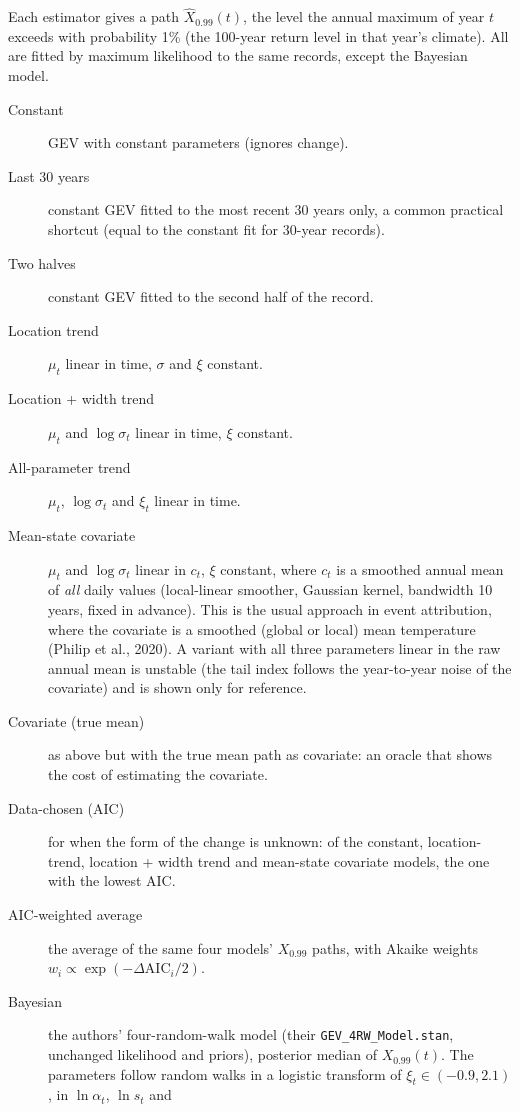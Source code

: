 \documentclass[11pt]{article}
\begin{document}
Each estimator gives a path $\hat X_{0.99}(t)$, the level the annual maximum of year $t$ exceeds
with probability 1\% (the 100-year return level in that year's climate). All are fitted by
maximum likelihood to the same records, except the Bayesian model.
\begin{description}
\item[Constant] GEV with constant parameters (ignores change).
\item[Last 30 years] constant GEV fitted to the most recent 30 years only, a common practical
  shortcut (equal to the constant fit for 30-year records).
\item[Two halves] constant GEV fitted to the second half of the record.
\item[Location trend] $\mu_t$ linear in time, $\sigma$ and $\xi$ constant.
\item[Location + width trend] $\mu_t$ and $\log\sigma_t$ linear in time, $\xi$ constant.
\item[All-parameter trend] $\mu_t$, $\log\sigma_t$ and $\xi_t$ linear in time.
\item[Mean-state covariate] $\mu_t$ and $\log\sigma_t$ linear in $c_t$, $\xi$ constant, where
  $c_t$ is a smoothed annual mean of \emph{all} daily values (local-linear smoother, Gaussian
  kernel, bandwidth 10 years, fixed in advance). This is the usual approach in event attribution,
  where the covariate is a smoothed (global or local) mean temperature (Philip et al., 2020). A
  variant with all three parameters linear in the raw annual mean is unstable (the tail index
  follows the year-to-year noise of the covariate) and is shown only for reference.
\item[Covariate (true mean)] as above but with the true mean path as covariate: an oracle that
  shows the cost of estimating the covariate.
\item[Data-chosen (AIC)] for when the form of the change is unknown: of the constant, location-trend,
  location + width trend and mean-state covariate models, the one with the lowest AIC.
\item[AIC-weighted average] the average of the same four models' $X_{0.99}$ paths, with Akaike
  weights $w_i\propto\exp(-\Delta\mathrm{AIC}_i/2)$.
\item[Bayesian] the authors' four-random-walk model (their \texttt{GEV\_4RW\_Model.stan},
  unchanged likelihood and priors), posterior median of $X_{0.99}(t)$. The parameters follow
  random walks in a logistic transform of $\xi_t\in(-0.9,2.1)$, in $\ln\alpha_t$, $\ln s_t$ and

\end{description}
\end{document}
